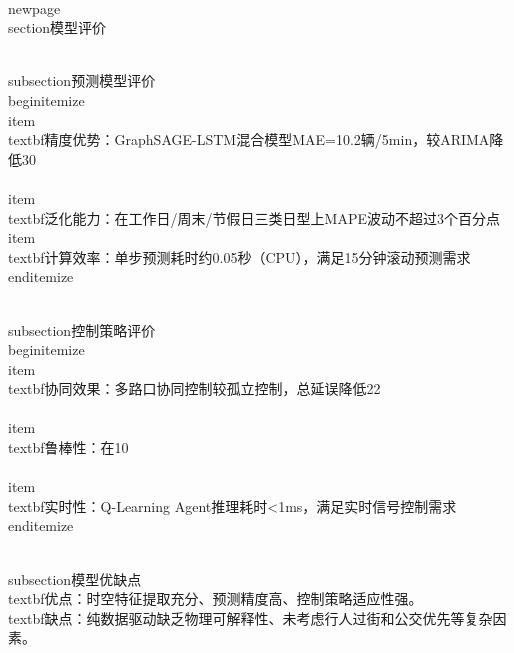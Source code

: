 \\newpage
\\section{模型评价}

\\subsection{预测模型评价}
\\begin{itemize}
    \\item \\textbf{精度优势}：GraphSAGE-LSTM混合模型MAE=10.2辆/5min，较ARIMA降低30\\%
    \\item \\textbf{泛化能力}：在工作日/周末/节假日三类日型上MAPE波动不超过3个百分点
    \\item \\textbf{计算效率}：单步预测耗时约0.05秒（CPU），满足15分钟滚动预测需求
\\end{itemize}

\\subsection{控制策略评价}
\\begin{itemize}
    \\item \\textbf{协同效果}：多路口协同控制较孤立控制，总延误降低22\\%
    \\item \\textbf{鲁棒性}：在10\\%
    \\item \\textbf{实时性}：Q-Learning Agent推理耗时<1ms，满足实时信号控制需求
\\end{itemize}

\\subsection{模型优缺点}
\\textbf{优点}：时空特征提取充分、预测精度高、控制策略适应性强。
\\textbf{缺点}：纯数据驱动缺乏物理可解释性、未考虑行人过街和公交优先等复杂因素。
